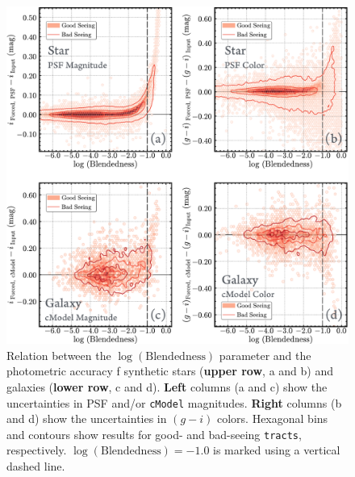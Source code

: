 \documentclass[useamsfonts]{pasj01}
\def\cmodel{\texttt{cModel}}
\def\tracts{\texttt{tracts}}
\begin{document}
\begin{figure}
    \begin{center}
        \includegraphics[width=\textwidth]{fig/synpipe_blendedness_err}
    \end{center}
    \caption{
        Relation between the $\log(\mathrm{Blendedness})$ parameter
        and the photometric accuracy f synthetic stars (\textbf{upper row}, a and 
        b) and galaxies (\textbf{lower row}, c and d).
        \textbf{Left} columns (a and c) show the uncertainties in PSF and/or \cmodel{} 
        magnitudes. \textbf{Right} columns (b and d) show the uncertainties in 
        $(g-i)$ colors.
        Hexagonal bins and contours show results for good- and bad-seeing
        \tracts{}, respectively.
        $\log(\mathrm{Blendedness}) = -1.0$ is marked using a vertical dashed line.
        }
    \label{fig:blend}
\end{figure}
\end{document}
